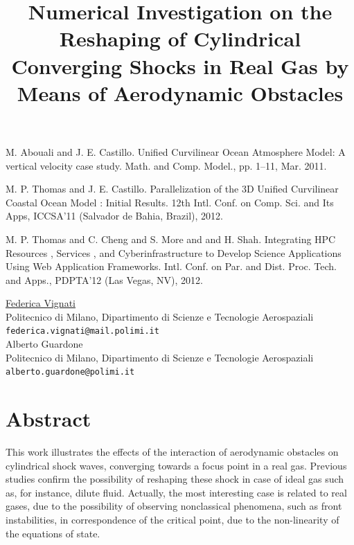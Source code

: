 \documentclass[article, A4, 11pt]{llncs}%
\begin{document}

\begin{thebibliography}{10}
{\sc M. Abouali and J. E. Castillo}. {Unified Curvilinear Ocean Atmosphere Model: A vertical velocity case study}. Math. and Comp. Model., pp. 1–11, Mar. 2011.

{\sc M. P. Thomas and J. E. Castillo}. {Parallelization of the 3D Unified Curvilinear Coastal Ocean Model : Initial Results}. 12th Intl. Conf. on Comp. Sci. and Its Apps, ICCSA'11 (Salvador de Bahia, Brazil), 2012.

{\sc  M. P. Thomas and C. Cheng and S. More and and H. Shah}. {Integrating HPC Resources , Services , and Cyberinfrastructure to Develop Science Applications Using Web Application Frameworks}. Intl. Conf. on Par. and Dist. Proc. Tech. and Apps., PDPTA'12 (Las Vegas, NV), 2012.
\end{thebibliography} %



\title{Numerical Investigation on the Reshaping of Cylindrical Converging Shocks in Real Gas by Means of Aerodynamic Obstacles}
 \author{} \institute{}
\maketitle
\begin{center}
{\large \underline{Federica Vignati}}\\
Politecnico di Milano, Dipartimento di Scienze e Tecnologie Aerospaziali\\
{\tt federica.vignati@mail.polimi.it}
\\ \vspace{4mm}
{\large Alberto Guardone}\\
Politecnico di Milano, Dipartimento di Scienze e Tecnologie Aerospaziali\\
{\tt alberto.guardone@polimi.it}
\end{center}

\section*{Abstract}
This work illustrates the effects of the interaction of aerodynamic obstacles on cylindrical shock waves, converging towards a focus point in a real gas. Previous studies confirm the possibility of reshaping these shock in case of ideal gas such as, for instance, dilute fluid. Actually, the most interesting case is related to real gases, due to the possibility of observing nonclassical phenomena, such as front instabilities, in correspondence of the critical point, due to the non-linearity of the equations of state.
\end{document}
